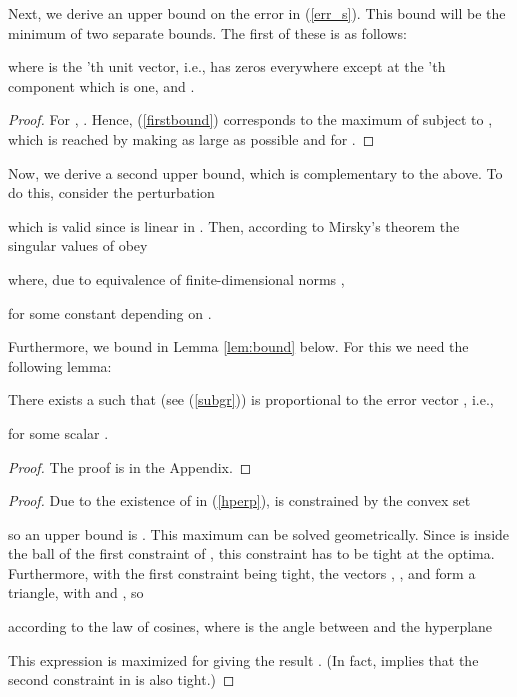 \documentclass{article}
\begin{document}
Next, we derive an upper bound on the error in (\ref{err_s}). This bound will be the minimum of two separate bounds. The first of these is as follows:
\begin{lemma}

where  is the 'th unit vector, i.e.,  has zeros everywhere except at the 'th component which is one, and .
\end{lemma}
\begin{proof}
For , . Hence, (\ref{firstbound}) corresponds to the maximum of  subject to , which is reached by making  as large as possible and  for .
\end{proof}

Now, we derive a second upper bound, which is complementary to the above. To do this, consider the perturbation

which is valid since  is linear in . Then, according to Mirsky's theorem \cite{Horn-Johnson-85} the singular values of  obey

where, due to equivalence of finite-dimensional norms \cite{Luenberger-69},

for some constant  depending on .

Furthermore, we bound  in Lemma \ref{lem:bound} below. For this we need the following lemma:

\begin{lemma} \label{lem:perp}
There exists a  such that  (see (\ref{subgr})) is proportional to the error vector , i.e.,

for some scalar .
\end{lemma}
\begin{proof}
The proof is in the Appendix.
\end{proof}

\begin{lemma} \label{lem:bound}

\end{lemma}
\begin{proof}
Due to the existence of  in (\ref{hperp}),  is constrained by the convex set

so an upper bound is . This maximum can be solved geometrically. Since  is inside the ball of the first constraint of , this constraint has to be tight at the optima. Furthermore, with the first constraint being tight, the vectors , , and  form a triangle, with  and , so

according to the law of cosines, where  is the angle between  and the hyperplane

This expression is maximized for  giving the result . (In fact,  implies that the second constraint in  is also tight.)
\end{proof}
\end{document}

